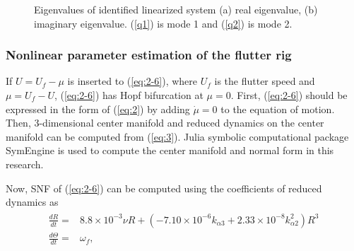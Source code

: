 \documentclass[openacc]{rsproca_new}%
\newcommand{\Eref}[1]{(\ref{#1})}
\begin{document}
\begin{figure}
  \centering
\caption{Eigenvalues of identified linearized system (a) real eigenvalue, (b) imaginary eigenvalue. (\ref{q1}) is mode 1 and (\ref{q2}) is mode 2.}
\label{f:7}
\end{figure}

\subsubsection{Nonlinear parameter estimation of the flutter rig}\label{nonlinear}

If $U=U_f-\mu$ is inserted to \Eref{eq:2-6}, where $U_f$ is the flutter speed and $\mu=U_f-U$, \Eref{eq:2-6} has Hopf bifurcation at $\mu=0$. First, \Eref{eq:2-6} should be expressed in the form of \Eref{eq:2} by adding $\dot \mu=0$ to the equation of motion. Then, 3-dimensional center manifold and reduced dynamics on the center manifold can be computed from \Eref{eq:3}. Julia symbolic computational package SymEngine is used to compute the center manifold and normal form in this research.

Now, SNF of \Eref{eq:2-6} can be computed using the coefficients of reduced dynamics as
\begin{align}\label{eq:2-11}
\begin{split}
\frac{dR}{dt}=&8.8\times 10^{-3}\nu R+(- 7.10 \times 10^{-6}  k_{\alpha 3} + 2.33 \times 10^{-8} k_{\alpha 2}^2)R^3\\
\frac{d\Theta}{dt}=&\omega_f,
\end{split}
\end{align}
\end{document}
